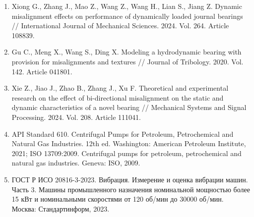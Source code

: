 \documentclass[14pt,a4paper]{extarticle}
\numberwithin{equation}{section}
\numberwithin{figure}{section}
\numberwithin{table}{section}
\begin{document}
\begin{enumerate}
    \item Xiong G., Zhang J., Mao Z., Wang Z., Wang H., Lian S., Jiang Z. Dynamic misalignment effects on performance of dynamically loaded journal bearings // International Journal of Mechanical Sciences. 2024. Vol. 264. Article 108839.
    \item Gu C., Meng X., Wang S., Ding X. Modeling a hydrodynamic bearing with provision for misalignments and textures // Journal of Tribology. 2020. Vol. 142. Article 041801.
    \item Xie Z., Jiao J., Zhao B., Zhang J., Xu F. Theoretical and experimental research on the effect of bi-directional misalignment on the static and dynamic characteristics of a novel bearing // Mechanical Systems and Signal Processing. 2024. Vol. 208. Article 111041.
    \item API Standard 610. Centrifugal Pumps for Petroleum, Petrochemical and Natural Gas Industries. 12th ed. Washington: American Petroleum Institute, 2021; ISO 13709:2009. Centrifugal pumps for petroleum, petrochemical and natural gas industries. Geneva: ISO, 2009.
    \item ГОСТ Р ИСО 20816-3-2023. Вибрация. Измерение и оценка вибрации машин. Часть 3. Машины промышленного назначения номинальной мощностью более 15 кВт и номинальными скоростями от 120 об/мин до 30000 об/мин. Москва: Стандартинформ, 2023.
\end{enumerate}
\end{document}
